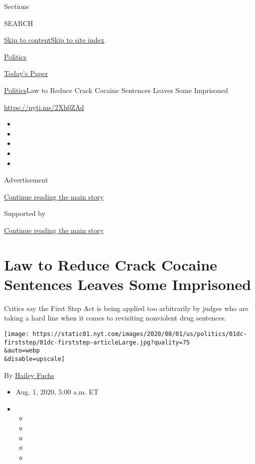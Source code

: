 Sections

SEARCH

\protect\hyperlink{site-content}{Skip to
content}\protect\hyperlink{site-index}{Skip to site index}

\href{https://www.nytimes.com/section/politics}{Politics}

\href{https://myaccount.nytimes.com/auth/login?response_type=cookie\&client_id=vi}{}

\href{https://www.nytimes.com/section/todayspaper}{Today's Paper}

\href{/section/politics}{Politics}\textbar{}Law to Reduce Crack Cocaine
Sentences Leaves Some Imprisoned

\url{https://nyti.ms/2Xh0ZAd}

\begin{itemize}
\item
\item
\item
\item
\item
\end{itemize}

Advertisement

\protect\hyperlink{after-top}{Continue reading the main story}

Supported by

\protect\hyperlink{after-sponsor}{Continue reading the main story}

\hypertarget{law-to-reduce-crack-cocaine-sentences-leaves-some-imprisoned}{%
\section{Law to Reduce Crack Cocaine Sentences Leaves Some
Imprisoned}\label{law-to-reduce-crack-cocaine-sentences-leaves-some-imprisoned}}

Critics say the First Step Act is being applied too arbitrarily by
judges who are taking a hard line when it comes to revisiting nonviolent
drug sentences.

\texttt{[image: https://static01.nyt.com/images/2020/08/01/us/politics/01dc-firststep/01dc-firststep-articleLarge.jpg?quality=75\\\&auto=webp\\\&disable=upscale]}

By \href{https://www.nytimes.com/by/hailey-fuchs}{Hailey Fuchs}

\begin{itemize}
\item
  Aug. 1, 2020, 5:00 a.m. ET
\item
  \begin{itemize}
  \item
  \item
  \item
  \item
  \item
  \end{itemize}
\end{itemize}

